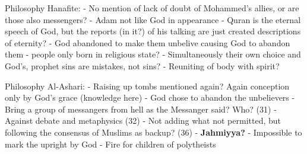 \documentclass[11 pt, twoside]{article}
\begin{document}
Philosophy Hanafite:
- No mention of lack of doubt of Mohammed's allies, or are those also messengers?
- Adam not like God in appearance
- Quran is the eternal speech of God, but the reports (in it?) of his talking are just created descriptions of eternity?
- God abandoned to make them unbelive causing God to abandon them - people only born in religious state?
- Simultaneously their own choice and God's, prophet sins are mistakes, not sins?
- Reuniting of body with spirit?

Philosophy Al-Ashari:
- Raising up tombs mentioned again? Again conception only by God's grace (knowledge here)
- God chose to abandon the unbelievers
- Bring a group of messangers from hell as the Messanger said? Who? (31)
- Against debate and metaphysics (32)
- Not adding what not permitted, but following the consensus of Muslims as backup? (36)
- \textbf{Jahmiyya?}
- Impossible to mark the upright by God
- Fire for children of polytheists
\end{document}
